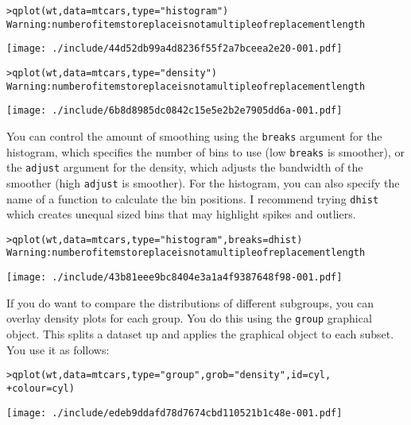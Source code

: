 \begin{alltt}
> qplot(wt, data = mtcars, type = "histogram")
Warning:  number of items to replace is not a multiple of replacement length 
\end{alltt}
\texttt{[image: ./include/44d52db99a4d8236f55f2a7bceea2e20-001.pdf]}
\begin{alltt}

> qplot(wt, data = mtcars, type = "density")
Warning:  number of items to replace is not a multiple of replacement length 
\end{alltt}
\texttt{[image: ./include/6b8d8985dc0842c15e5e2b2e7905dd6a-001.pdf]}
\begin{alltt}

\end{alltt}%

You can control the amount of smoothing using the {\tt breaks} argument for the histogram, which specifies the number of bins to use (low {\tt breaks} is smoother), or the {\tt adjust} argument for the density, which adjusts the bandwidth of the smoother (high {\tt adjust} is smoother).  For the histogram, you can also specify the name of a function to calculate the bin positions.  I recommend trying {\tt dhist} which creates unequal sized bins that may highlight spikes and outliers.

\begin{alltt}
> qplot(wt, data = mtcars, type = "histogram", breaks = dhist)
Warning:  number of items to replace is not a multiple of replacement length 
\end{alltt}
\texttt{[image: ./include/43b81eee9bc8404e3a1a4f9387648f98-001.pdf]}
\begin{alltt}

\end{alltt}%

If you do want to compare the distributions of different subgroups, you can overlay density plots for each group. You do this using the {\tt group} graphical object.  This splits a dataset up and applies the graphical object to each subset.  You use it as follows:

\begin{alltt}
> qplot(wt, data = mtcars, type = "group", grob = "density", id = cyl, 
+     colour = cyl)
\end{alltt}
\texttt{[image: ./include/edeb9ddafd78d7674cbd110521b1c48e-001.pdf]}
\begin{alltt}

\end{alltt}%

